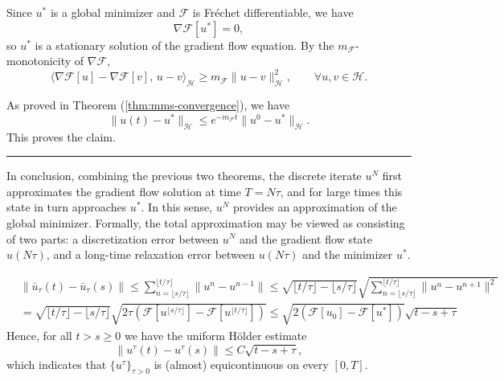 \documentclass[twoside,11pt]{article}
\newcommand{\BlackBoxProof}{\rule{1.5ex}{1.5ex}}
\renewenvironment{proof}{\par\noindent{\bf Proof\ }}{\hfill\BlackBoxProof\par\medskip}
\newcommand{\calF}{\mathcal{F}}
\newcommand{\calH}{\mathcal{H}}
\begin{document}
\begin{proof}
Since $u^\ast$ is a global minimizer and $\calF$ is Fr\'echet differentiable, we have
\[
\nabla\calF[u^\ast]=0,
\]
so $u^\ast$ is a stationary solution of the gradient flow equation. By the $m_{\calF}$-monotonicity of $\nabla\calF$,
\[
\langle \nabla\calF[u]-\nabla\calF[v],\,u-v\rangle_{\calH}
\ge m_{\calF}\|u-v\|_{\calH}^2,
\qquad \forall u,v\in\calH.
\]

As proved in Theorem (\ref{thm:mms-convergence}), we have
\[
\|u(t)-u^\ast\|_{\calH}
\le e^{-m_{\calF}t}\|u^0-u^\ast\|_{\calH}.
\]
This proves the claim.
\end{proof}


In conclusion, combining the previous two theorems, the discrete iterate $u^N$ first approximates the gradient flow solution at time $T=N\tau$, and for large times this state in turn approaches $u^\ast$. In this sense, $u^N$ provides an approximation of the global minimizer. Formally, the total approximation may be viewed as consisting of two parts: a discretization error between $u^N$ and the gradient flow state $u(N\tau)$, and a long-time relaxation error between $u(N\tau)$ and the minimizer $u^\ast$.






\iffalse
\begin{equation}
\begin{aligned}
 & \| \bar{u}_{\tau} (t) - \bar{u}_{\tau} (s) \| \leq \sum_{n = \lfloor s/ \tau \rfloor}^{\lfloor t / \tau \rfloor} \| u^n - u^{n-1} \| \leq \sqrt{ \lfloor t/ \tau \rfloor - \lfloor s/ \tau \rfloor} \sqrt{ \sum_{n = \lfloor s/ \tau \rfloor}^{\lfloor t / \tau \rfloor} \| u^{n} - u^{n+1} \|^2 } \\
 & = \sqrt{ \lfloor t/ \tau \rfloor - \lfloor s/ \tau \rfloor} \sqrt{2 \tau ( \mathcal{F}[u^{\lfloor s/ \tau \rfloor}] - \mathcal{F}[u^{\lfloor t / \tau \rfloor}])} \leq \sqrt{2 (\mathcal{F}[u_0] - \mathcal{F}[u^*])} \sqrt{t -s + \tau}
 \end{aligned}
\end{equation}
Hence, for all $t > s \ge0$ we have the uniform H\"older estimate
\begin{equation}\label{eq:holder}
\|u^\tau(t)-u^\tau(s)\|
\le C \sqrt{t-s +\tau}  ,
\end{equation}
which indicates that $\{u^\tau\}_{\tau>0}$ is (almost) equicontinuous on every $[0,T]$. 
\end{document}
